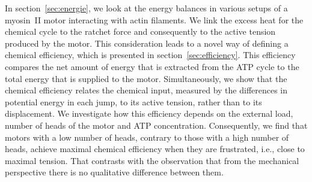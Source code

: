 \documentclass[aps,pre,twocolumn,showpacs,showkeys,superscriptaddress,floatfix]{revtex4-1}
\begin{document}
In section~\ref{sec:energie}, we look at the energy balances in various setups of a myosin~II motor interacting with actin filaments.
We link the excess heat for the chemical cycle to the ratchet force and consequently to the active tension produced by the motor.
This consideration leads to a novel way of defining a chemical efficiency, which is presented in section~\ref{sec:efficiency}. 
This efficiency compares the net amount of energy that is extracted from the ATP cycle to the total energy that is supplied to the motor.
Simultaneously, we show that the chemical efficiency relates the chemical input, measured by the differences in potential energy in each jump, 
to its active tension, rather than to its displacement.
We investigate how this efficiency depends on the external load, number of heads of the motor and ATP concentration. 
Consequently, we find that motors with a low number of heads, contrary to those with a high number of heads, achieve maximal chemical efficiency when they are frustrated, i.e., close to maximal tension.
That contrasts with the observation that from the mechanical perspective there is no qualitative difference between them. 
\end{document}
